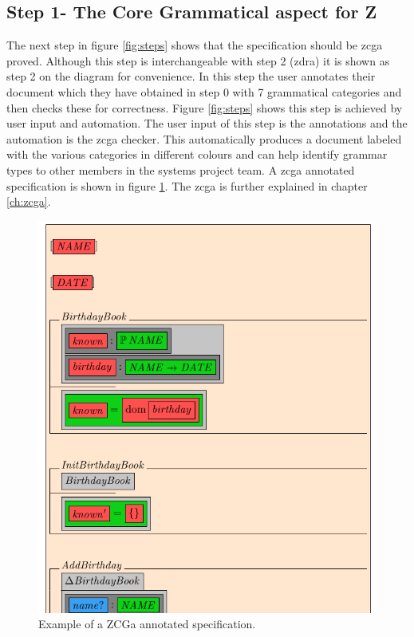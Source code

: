\subsection{Step 1- The Core Grammatical aspect for Z}

The next step in figure \ref{fig:steps} shows that the specification should be
\gls{zcga} proved. Although this step is interchangeable with step 2 (\gls{zdra})
it is shown as step 2 on the diagram for convenience. In this step the user
annotates their document which they have obtained in step 0 with 7 grammatical
categories and then checks these for correctness. Figure \ref{fig:steps} shows
this step is achieved by user input and automation. The user input of this step
is the annotations and the automation is the \gls{zcga} checker. This
automatically produces a document labeled with the various categories in different
colours and can help identify grammar types to other members in the systems
project team. A \gls{zcga} annotated specification is shown in figure
\ref{fig:zcgaexample}. The \gls{zcga} is further explained in chapter
\ref{ch:zcga}.

\begin{figure}[H]
 \begin{center}
 \includegraphics [scale=0.25]{Figures/Design/zcgaexample.png}
 \caption{Example of a ZCGa annotated specification.}
 \label{fig:zcgaexample}
\end{center}
\end{figure} 


